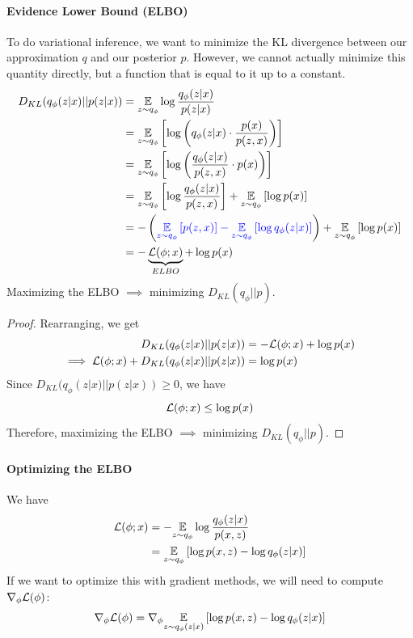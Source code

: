 \documentclass[11pt]{article}
\begin{document}
\paragraph{Evidence Lower Bound (ELBO)}
To do variational inference, we want to minimize the KL divergence between our approximation $q$ and our posterior $p$. However, we cannot actually minimize this quantity directly, but a function that is equal to it up to a constant.
\begin{align*}
	D_{KL}(q_\phi(z|x)||p(z|x)) &= \underset{z \sim q_\phi}{\mathbb{E}} \log \frac{q_\phi(z|x)}{p(z|x)} \\
	&= \underset{z \sim q_\phi}{\mathbb{E}} \left[ \log \left( q_\phi(z|x) \cdot \frac{p(x)}{p(z,x)}\right) \right ] \\
	&= \underset{z \sim q_\phi}{\mathbb{E}} \left[ \log \left( \frac{q_\phi(z|x)}{p(z,x)}\cdot p(x) \right )\right ] \\
	&= \underset{z \sim q_\phi}{\mathbb{E}} \left[ \log \frac{q_\phi (z|x)}{p(z,x)}\right] + \underset{z \sim q_\phi}{\mathbb{E}} \left[\log p(x)\right] \\
	&= -\left(\textcolor{blue}{\underset{z \sim q_\phi}{\mathbb{E}} \left[p(z,x)\right]  - \underset{z \sim q_\phi}{\mathbb{E}} \left[ \log q_\phi (z|x)\right] }\right)+ \underset{z \sim q_\phi}{\mathbb{E}} \left[ \log p(x) \right]\\
	&= - \underbrace{\mathcal{L}(\phi;x)}_{ELBO} + \log p(x)
\end{align*}
 Maximizing the ELBO $\implies$ minimizing $D_{KL}(q_\phi || p)$.
\begin{proof}
	Rearranging, we get
	\begin{align*}
		D_{KL}(q_\phi(z|x)||p(z|x)) &= -\mathcal{L}(\phi;x) + \log p(x) \\
		\implies \mathcal{L}(\phi;x) + D_{KL}(q_\phi(z|x)||p(z|x)) &= \log p(x)
	\end{align*}
	Since $D_{KL}(q_\phi(z|x)||p(z|x)) \geq 0$, we have
	$$\mathcal{L}(\phi;x) \leq \log p(x)$$
	Therefore, maximizing the ELBO $\implies$ minimizing $D_{KL}(q_\phi || p)$.
\end{proof} 
\paragraph{Optimizing the ELBO}
We have
\begin{align*}
	\mathcal{L}(\phi;x) &=  -\underset{z \sim q_\phi}{\mathbb{E}} \log \frac{q_\phi(z|x)}{p(x,z)}\\
	&= \underset{z \sim q_\phi}{\mathbb{E}}\left[ \log p(x,z) - \log q_\phi (z|x)\right]
\end{align*}
If we want to optimize this with gradient methods, we will need to compute $\nabla_\phi \mathcal{L}(\phi)$:
$$\nabla_\phi \mathcal{L}(\phi) = \nabla_\phi \underset{z \sim q_\phi(z|x)}{\mathbb{E}}\left[ \log p(x,z) - \log q_\phi (z|x)\right]$$
\end{document}
